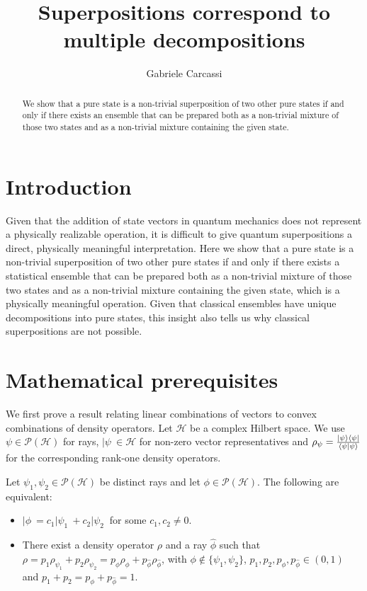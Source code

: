 \documentclass{techbrief}
\title{Superpositions correspond to multiple decompositions}
\author{Gabriele Carcassi}
\begin{document}
\maketitle

\begin{abstract}
	We show that a pure state is a non-trivial superposition of two other pure states if and only if there exists an ensemble that can be prepared both as a non-trivial mixture of those two states and as a non-trivial mixture containing the given state.
\end{abstract}

\section{Introduction}

Given that the addition of state vectors in quantum mechanics does not represent a physically realizable operation, it is difficult to give quantum superpositions a direct, physically meaningful interpretation. Here we show that a pure state is a non-trivial superposition of two other pure states if and only if there exists a statistical ensemble that can be prepared both as a non-trivial mixture of those two states and as a non-trivial mixture containing the given state, which is a physically meaningful operation. Given that classical ensembles have unique decompositions into pure states, this insight also tells us why classical superpositions are not possible.

\section{Mathematical prerequisites}

We first prove a result relating linear combinations of vectors to convex combinations of density operators. Let $\mathcal{H}$ be a complex Hilbert space. We use $\psi\in\mathcal{P}(\mathcal{H})$ for rays, $|\psi\>\in\mathcal{H}$ for non-zero vector representatives and $\rho_\psi=\frac{|\psi\rangle\langle\psi|}{\langle\psi|\psi\rangle}$ for the corresponding rank-one density operators.

\begin{prop}\label{superpositionDecompositions}
	Let $\psi_1,\psi_2\in\mathcal{P}(\mathcal{H})$ be distinct rays and let $\phi\in\mathcal{P}(\mathcal{H})$. The following are equivalent:
	\begin{itemize}
		\item $|\phi\>=c_1|\psi_1\>+c_2|\psi_2\>$ for some $c_1,c_2\neq0$.
		\item There exist a density operator $\rho$ and a ray $\hat{\phi}$ such that $\rho=p_1\rho_{\psi_1}+p_2\rho_{\psi_2}=p_\phi\rho_\phi+p_{\hat{\phi}}\rho_{\hat{\phi}}$, with $\phi\notin\{\psi_1,\psi_2\}$, $p_1,p_2,p_\phi,p_{\hat{\phi}} \in (0,1)$ and $p_1+p_2=p_\phi+p_{\hat{\phi}}=1$.
	\end{itemize}
\end{prop}
\end{document}

